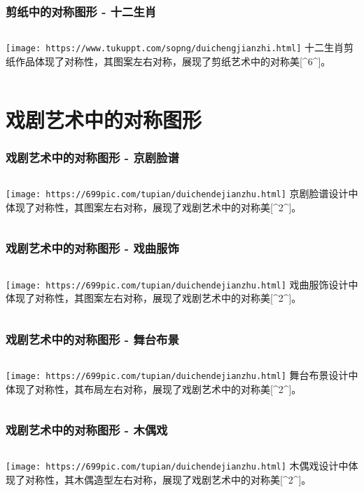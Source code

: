 \documentclass{ctexbeamer}
\begin{document}
\begin{frame}
\frametitle{剪纸中的对称图形 - 十二生肖}
\begin{columns}
\texttt{[image: https://www.tukuppt.com/sopng/duichengjianzhi.html]}
十二生肖剪纸作品体现了对称性，其图案左右对称，展现了剪纸艺术中的对称美[^6^]。
\end{columns}
\end{frame}

\section{戏剧艺术中的对称图形}

\begin{frame}
\frametitle{戏剧艺术中的对称图形 - 京剧脸谱}
\begin{columns}
\texttt{[image: https://699pic.com/tupian/duichendejianzhu.html]}
京剧脸谱设计中体现了对称性，其图案左右对称，展现了戏剧艺术中的对称美[^2^]。
\end{columns}
\end{frame}

\begin{frame}
\frametitle{戏剧艺术中的对称图形 - 戏曲服饰}
\begin{columns}
\texttt{[image: https://699pic.com/tupian/duichendejianzhu.html]}
戏曲服饰设计中体现了对称性，其图案左右对称，展现了戏剧艺术中的对称美[^2^]。
\end{columns}
\end{frame}

\begin{frame}
\frametitle{戏剧艺术中的对称图形 - 舞台布景}
\begin{columns}
\texttt{[image: https://699pic.com/tupian/duichendejianzhu.html]}
舞台布景设计中体现了对称性，其布局左右对称，展现了戏剧艺术中的对称美[^2^]。
\end{columns}
\end{frame}

\begin{frame}
\frametitle{戏剧艺术中的对称图形 - 木偶戏}
\begin{columns}
\texttt{[image: https://699pic.com/tupian/duichendejianzhu.html]}
木偶戏设计中体现了对称性，其木偶造型左右对称，展现了戏剧艺术中的对称美[^2^]。
\end{columns}
\end{frame}
\end{document}
